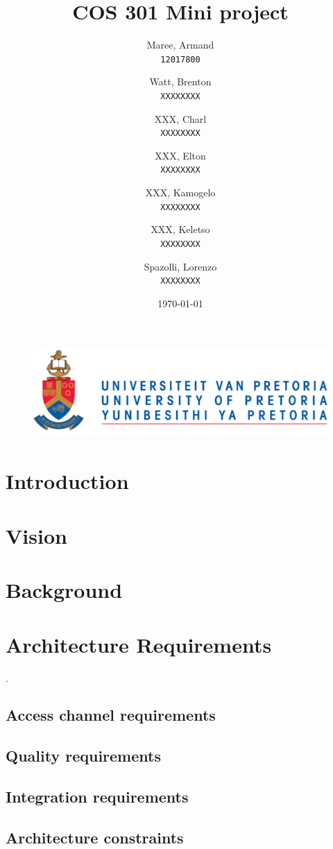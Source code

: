 \documentclass[english]{article}
\author{
	Maree, Armand\\
	\texttt{12017800}
	\and
	Watt, Brenton\\
	\texttt{XXXXXXXX}
	\and
	XXX, Charl\\
	\texttt{XXXXXXXX}
	\and
	XXX, Elton\\
	\texttt{XXXXXXXX}
	\and
	XXX, Kamogelo\\
	\texttt{XXXXXXXX}
	\and
	XXX, Keletso\\
	\texttt{XXXXXXXX}
	\and
	Spazolli, Lorenzo\\
	\texttt{XXXXXXXX}
}
\title{COS 301 Mini project}
\date{\today}
\begin{document}
	\maketitle
	\begin{figure}[!t]
		\includegraphics[width=\linewidth]{up_logo.png}
	\end{figure}
	\newpage
	\tableofcontents
	\newpage
	
	\section{Introduction}
	
	\newpage
	\section{Vision}
	
	\newpage
	\section{Background}
	
	\newpage
	\section{Architecture Requirements}.
		\subsection{Access channel requirements}

		\subsection{Quality requirements}

		\subsection{Integration requirements}

		\subsection{Architecture constraints}
\end{document}
